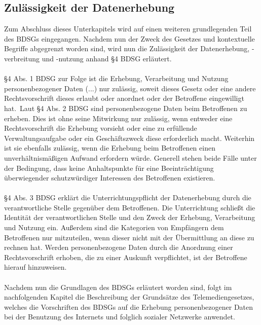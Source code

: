\subsection{Zulässigkeit der Datenerhebung}
Zum Abschluss dieses Unterkapitels wird auf einen weiteren grundlegenden Teil des BDSGs eingegangen. Nachdem nun der Zweck des Gesetzes und kontextuelle Begriffe abgegrenzt worden sind, wird nun die Zulässigkeit der Datenerhebung, -verbreitung und -nutzung anhand \S 4 BDSG erläutert.\\
\\\S 4 Abs. 1 BDSG zur Folge ist die \glqq Erhebung, Verarbeitung und Nutzung personenbezogener Daten (...) nur zulässig, soweit dieses Gesetz oder eine andere Rechtsvorschrift dieses erlaubt oder anordnet oder der Betroffene eingewilligt hat.\grqq \ Laut \S 4 Abs. 2 BDSG sind personenbezogene Daten beim Betroffenen zu erheben. Dies ist ohne seine Mitwirkung nur zulässig, wenn entweder eine Rechtsvorschrift die Erhebung vorsieht oder eine zu erfüllende Verwaltungsaufgabe oder ein Geschäftszweck diese erforderlich macht. Weiterhin ist sie ebenfalls zulässig, wenn \glqq die Erhebung beim Betroffenen einen unverhältnismäßigen Aufwand erfordern würde\grqq. Generell stehen beide Fälle unter der Bedingung, dass keine Anhaltspunkte für eine Beeinträchtigung überwiegender schutzwürdiger Interessen des Betroffenen existieren.\\
\\\S 4 Abs. 3 BDSG erklärt die Unterrichtungspflicht der Datenerhebung durch die verantwortliche Stelle gegenüber dem Betroffenen. Die Unterrichtung schließt die Identität der verantwortlichen Stelle und den Zweck der Erhebung, Verarbeitung und Nutzung ein. Außerdem sind die Kategorien von Empfängern dem Betroffenen nur mitzuteilen, wenn dieser nicht mit der Übermittlung an diese zu rechnen hat. Werden personenbezogene Daten durch die Anordnung einer Rechtsvorschrift erhoben, die zu einer Auskunft verpflichtet, ist der Betroffene hierauf hinzuweisen.\\
\\Nachdem nun die Grundlagen des BDSGs erläutert worden sind, folgt im nachfolgenden Kapitel die Beschreibung der Grundsätze des Telemediengesetzes, welches die Vorschriften des BDSGs auf die Erhebung personenbezogener Daten bei der Benutzung des Internets und folglich sozialer Netzwerke anwendet.